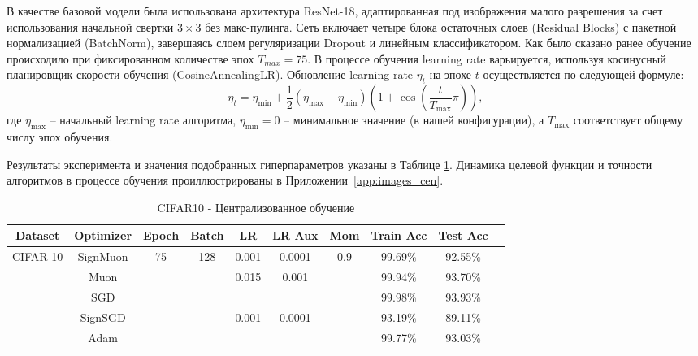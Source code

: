\documentclass{article}
\begin{document}
В качестве базовой модели была использована архитектура ResNet-18, адаптированная под изображения малого разрешения за счет использования начальной свертки $3\times3$ без макс-пулинга. Сеть включает четыре блока остаточных слоев (Residual Blocks) с пакетной нормализацией (BatchNorm), завершаясь слоем регуляризации Dropout и линейным классификатором. Как было сказано ранее обучение происходило при фиксированном количестве эпох $T_{max}=75$. В процессе обучения learning rate варьируется, используя косинусный планировщик скорости обучения (CosineAnnealingLR). Обновление learning rate $\eta_t$ на эпохе $t$ осуществляется по следующей формуле:
\begin{equation}
\eta_t = \eta_{\text{min}} + \frac{1}{2}(\eta_{\text{max}} - \eta_{\text{min}})\left(1 + \cos\left(\frac{t}{T_{\text{max}}}\pi\right)\right),
\end{equation}
где $\eta_{\text{max}}$ -- начальный learning rate алгоритма, $\eta_{\text{min}} = 0$ -- минимальное значение (в нашей конфигурации), а $T_{\text{max}}$ соответствует общему числу эпох обучения. 

Результаты эксперимента и значения подобранных гиперпараметров указаны в Таблице \ref{tab:cifar_central}. Динамика целевой функции и точности алгоритмов в процессе обучения проиллюстрированы в Приложении~\ref{app:images_cen}.
\begin{table}[H]
\centering
\caption{CIFAR10 - Централизованное обучение}
\label{tab:cifar_central}
\small
\renewcommand{\arraystretch}{1.2}
\begin{tabular}{|c|c|c|c|c|c|c|c|c|c|}
\hline
\textbf{Dataset} & \textbf{Optimizer} & \textbf{Epoch} & \textbf{Batch} & \textbf{LR} & \textbf{LR Aux} & \textbf{Mom} & \textbf{Train Acc} & \textbf{Test Acc} \\
\hline
\multirow{5}{*}{CIFAR-10} & SignMuon & \multirow{5}{*}{75} & \multirow{5}{*}{128} & 0.001 & 0.0001 & \multirow{5}{*}{0.9} & 99.69\% & 92.55\% \\
\cline{2-2} \cline{5-6} \cline{8-9}
 & Muon & & & \multirow{2}{*}{0.015}  & \multirow{2}{*}{0.001} & & 99.94\% & 93.70\% \\
\cline{2-2} \cline{8-9}
& SGD & & & & & & 99.98\% & 93.93\% \\
\cline{2-2} \cline{5-6} \cline{8-9}
& SignSGD & & & \multirow{2}{*}{0.001}  & \multirow{2}{*}{0.0001}  & & 93.19\% & 89.11\% \\
\cline{2-2} \cline{8-9}
 & Adam & & &  & & & 99.77\% & 93.03\% \\
\hline
\end{tabular}
\end{table}
\end{document}
